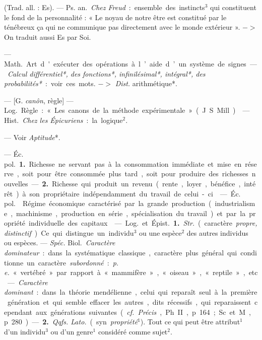
	\begin{itemize}[leftmargin=1cm, label=, itemsep=11pt]

 (Trad. all. : Es). — \si{Ps. an.} {\it Chez
Freud} : ensemble des instincts$^3$ qui
constituent le fond de la personnalité :
« Le noyau de notre être est constitué
par le ténébreux ça qui ne communique pas directement avec le
monde extérieur ». $->$ On traduit
aussi Es par Soi.

 — \si{Math.} Art d'exécuter des
opérations à l’aide d’un système de
signes. — {\it Calcul différentiel*, des
fonctions*, infinilésimal*, intégral*,
des probabilités*} : voir ces mots.
$->$ {\it Dist.} arithmétique*.

 — [G. {\it canôn}, règle] — \si{Log.}
Règle : « Les canons de la méthode
expérimentale » (J. S. Mill).

 — \si{Hist.} {\it Chez les Épicuriens} : la logique$^2$.

 — Voir {\it Aptitude}*.

 — \si{Éc. pol.} {\bf 1.} Richesse ne
servant pas à la consommation
immédiate et mise en réserve, soit
pour être consommée plus tard, soit
pour produire des richesses nouvelles. — {\bf 2.} Richesse qui produit un
revenu (rente, loyer, bénéfice, intérêt) à son propriétaire indépendamment du travail de celui-ci.

 — \si{Éc. pol.}  Régime économique caractérisé par la grande
production (industrialisme, machinisme, production en série, spécialisation
du travail) et par la propriété individuelle des capitaux.

 — \si{Log.} et \si{Épist.} {\bf 1.}  {\it Str.}
(caractère {\it propre, distinctif}). Ce qui
distingue un individu$^3$ ou une espèce$^2$
des autres individus ou espèces. —
{\it {\it Spéc.}} \si{Biol.} {\it Caractère dominateur} :
dans la systématique classique,
caractère plus général qui conditionne un caractère {\it subordonné} : {\it p. e.}
« vertébré » par rapport à « mammifère », « oiseau », « reptile », etc. —
{\it Caractère dominant} : dans la théorie
mendélienne, celui qui reparaît seul
à la première génération et qui
semble effacer les autres, dits récessifs, qui reparaissent cependant aux
générations suivantes ({\it cf.} {\it Précis},
Ph. II, p. 164; Sc. et M., p. 280). —
 {\bf 2.} {\it Qqfs.  {\it Lato.}} (syn. {\it propriété}$^1$). Tout
ce qui peut être attribut$^1$ d’un individu$^3$ ou d’un genre$^1$ considéré
comme sujet$^2$.


\end{itemize}
